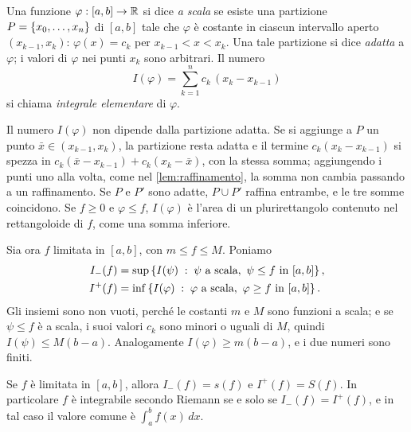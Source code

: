 \begin{definizione}\label{def:funzione-scala}
Una funzione $\varphi:[a,b]\to\mathbb{R}$ si dice \emph{a scala} se esiste una partizione
$P=\left\{ x_{0},\dots,x_{n} \right\}$ di $[a,b]$ tale che $\varphi$ è costante in ciascun
intervallo aperto $(x_{k-1},x_{k})$: $\varphi(x)=c_{k}$ per $x_{k-1}<x<x_{k}$. Una tale
partizione si dice \emph{adatta} a $\varphi$; i valori di $\varphi$ nei punti $x_{k}$
sono arbitrari. Il numero
\begin{equation}\label{eq:integrale-scala}
  I(\varphi)=\sum_{k=1}^{n}c_{k}\,(x_{k}-x_{k-1})
\end{equation}
si chiama \emph{integrale elementare} di $\varphi$.
\end{definizione}

Il numero $I(\varphi)$ non dipende dalla partizione adatta. Se si aggiunge a $P$ un
punto $\bar x\in(x_{k-1},x_{k})$, la partizione resta adatta e il termine
$c_{k}(x_{k}-x_{k-1})$ si spezza in $c_{k}(\bar x-x_{k-1})+c_{k}(x_{k}-\bar x)$, con la
stessa somma; aggiungendo i punti uno alla volta, come nel \cref{lem:raffinamento}, la
somma non cambia passando a un raffinamento. Se $P$ e $P'$ sono adatte, $P\cup P'$
raffina entrambe, e le tre somme coincidono. Se $f\ge0$ e $\varphi\le f$, $I(\varphi)$ è
l'area di un plurirettangolo contenuto nel rettangoloide di $f$, come una somma
inferiore.

Sia ora $f$ limitata in $[a,b]$, con $m\le f\le M$. Poniamo
\begin{equation}\label{eq:integrali-scala}
\begin{aligned}
  I_{-}(f)&=\sup\set{I(\psi) \tc \psi \text{ a scala},\ \psi\le f \text{ in }[a,b]},\\
  I^{+}(f)&=\inf\set{I(\varphi) \tc \varphi \text{ a scala},\ \varphi\ge f \text{ in }[a,b]} .
\end{aligned}
\end{equation}
Gli insiemi sono non vuoti, perché le costanti $m$ e $M$ sono funzioni a scala; e se
$\psi\le f$ è a scala, i suoi valori $c_{k}$ sono minori o uguali di $M$, quindi
$I(\psi)\le M(b-a)$. Analogamente $I(\varphi)\ge m(b-a)$, e i due numeri sono finiti.

\begin{proposizione}\label{prop:scala-darboux}
Se $f$ è limitata in $[a,b]$, allora $I_{-}(f)=s(f)$ e $I^{+}(f)=S(f)$. In particolare
$f$ è integrabile secondo Riemann se e solo se $I_{-}(f)=I^{+}(f)$, e in tal caso il
valore comune è $\int_{a}^{b}f(x)\,dx$.
\end{proposizione}

